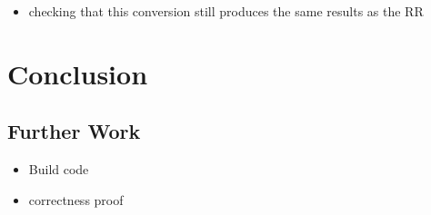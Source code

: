 \documentclass{article}
\begin{document}
\begin{itemize}
  \item checking that this conversion still produces the same results as the RR 
\end{itemize}



\section{Conclusion}








\subsection{Further Work}

\begin{itemize}
  \item Build code
  \item correctness proof 
\end{itemize}

 

%











     
\end{document}
